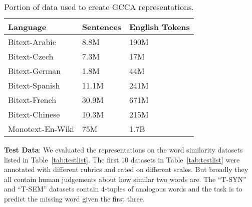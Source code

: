 \begin{table}[htbp]
  \centering
  \begin{tabular}{lll}
    Language & Sentences & English Tokens \\
    \hline
    Bitext-Arabic   & 8.8M   & 190M  \\
    Bitext-Czech    & 7.3M   & 17M   \\
    Bitext-German   & 1.8M   & 44M   \\
    Bitext-Spanish  & 11.1M  & 241M  \\
    Bitext-French   & 30.9M  & 671M  \\
    Bitext-Chinese  & 10.3M  & 215M  \\
    Monotext-En-Wiki& 75M    & 1.7B 
  \end{tabular}  
  \caption{Portion of data used to create GCCA representations.}
  \label{tab:dataperlang}
\end{table}

\noindent\textbf{Test Data}: We evaluated the representations on the
word similarity datasets listed in Table~\ref{tab:testlist}. The first
10 datasets in Table~\ref{tab:testlist} were annotated with different
rubrics and rated on different scales. But broadly they all
contain human judgements about how similar two words are.
The ``T-SYN'' and ``T-SEM'' datasets contain 4-tuples of
analogous words and the task is to predict the missing word given the
first three.

